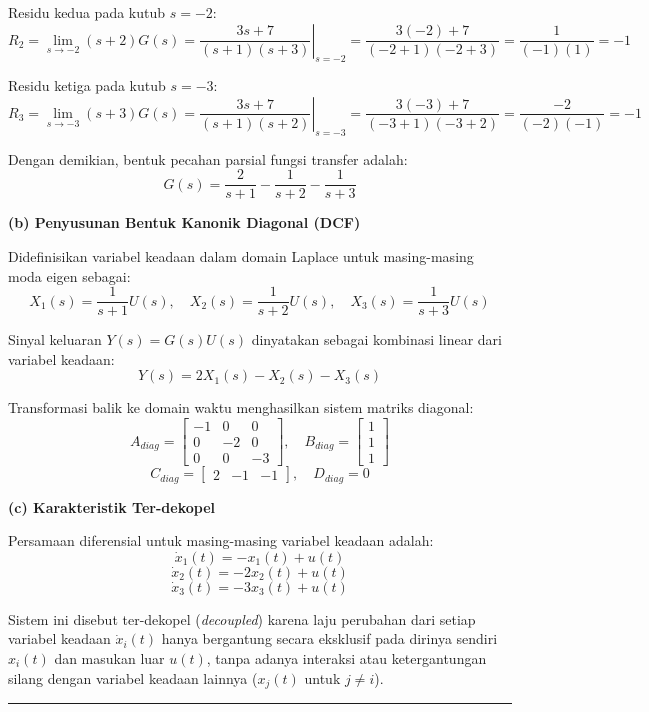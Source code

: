 \documentclass[11pt,a4paper]{article}
\begin{document}
Residu kedua pada kutub $s = -2$:
$$R_2 = \lim_{s \to -2} (s+2) G(s) = \left. \frac{3s + 7}{(s+1)(s+3)} \right|_{s=-2} = \frac{3(-2) + 7}{(-2+1)(-2+3)} = \frac{1}{(-1)(1)} = -1$$

Residu ketiga pada kutub $s = -3$:
$$R_3 = \lim_{s \to -3} (s+3) G(s) = \left. \frac{3s + 7}{(s+1)(s+2)} \right|_{s=-3} = \frac{3(-3) + 7}{(-3+1)(-3+2)} = \frac{-2}{(-2)(-1)} = -1$$

Dengan demikian, bentuk pecahan parsial fungsi transfer adalah:
$$G(s) = \frac{2}{s+1} - \frac{1}{s+2} - \frac{1}{s+3}$$

\textbf{(b) Penyusunan Bentuk Kanonik Diagonal (DCF)}

Didefinisikan variabel keadaan dalam domain Laplace untuk masing-masing moda eigen sebagai:
$$X_1(s) = \frac{1}{s+1} U(s), \quad X_2(s) = \frac{1}{s+2} U(s), \quad X_3(s) = \frac{1}{s+3} U(s)$$

Sinyal keluaran $Y(s) = G(s) U(s)$ dinyatakan sebagai kombinasi linear dari variabel keadaan:
$$Y(s) = 2 X_1(s) - X_2(s) - X_3(s)$$

Transformasi balik ke domain waktu menghasilkan sistem matriks diagonal:
$$A_{diag} = \begin{bmatrix} -1 & 0 & 0 \\ 0 & -2 & 0 \\ 0 & 0 & -3 \end{bmatrix}, \quad B_{diag} = \begin{bmatrix} 1 \\ 1 \\ 1 \end{bmatrix}$$
$$C_{diag} = \begin{bmatrix} 2 & -1 & -1 \end{bmatrix}, \quad D_{diag} = 0$$

\textbf{(c) Karakteristik Ter-dekopel}

Persamaan diferensial untuk masing-masing variabel keadaan adalah:
$$\dot{x}_1(t) = -x_1(t) + u(t)$$
$$\dot{x}_2(t) = -2x_2(t) + u(t)$$
$$\dot{x}_3(t) = -3x_3(t) + u(t)$$

Sistem ini disebut ter-dekopel (\textit{decoupled}) karena laju perubahan dari setiap variabel keadaan $\dot{x}_i(t)$ hanya bergantung secara eksklusif pada dirinya sendiri $x_i(t)$ dan masukan luar $u(t)$, tanpa adanya interaksi atau ketergantungan silang dengan variabel keadaan lainnya ($x_j(t)$ untuk $j \ne i$).

\vspace{12pt}
\hrule
\vspace{10pt}
\end{document}
